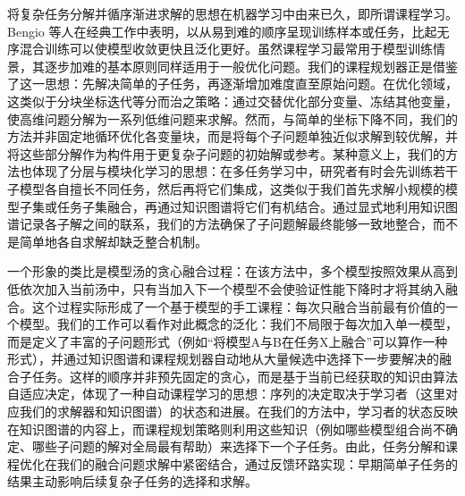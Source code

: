 \documentclass[../main.tex]{subfiles}
\begin{document}
\label{sec:ch5-2-2-task-decomposition-curriculum-optimization}
将复杂任务分解并循序渐进求解的思想在机器学习中由来已久，即所谓课程学习。Bengio 等人在经典工作中表明，以从易到难的顺序呈现训练样本或任务，比起无序混合训练可以使模型收敛更快且泛化更好。虽然课程学习最常用于模型训练情景，其逐步加难的基本原则同样适用于一般优化问题。我们的课程规划器正是借鉴了这一思想：先解决简单的子任务，再逐渐增加难度直至原始问题。在优化领域，这类似于分块坐标迭代等分而治之策略：通过交替优化部分变量、冻结其他变量，使高维问题分解为一系列低维问题来求解。然而，与简单的坐标下降不同，我们的方法并非固定地循环优化各变量块，而是将每个子问题单独近似求解到较优解，并将这些部分解作为构件用于更复杂子问题的初始解或参考。某种意义上，我们的方法也体现了分层与模块化学习的思想：在多任务学习中，研究者有时会先训练若干子模型各自擅长不同任务，然后再将它们集成，这类似于我们首先求解小规模的模型子集或任务子集融合，再通过知识图谱将它们有机结合。通过显式地利用知识图谱记录各子解之间的联系，我们的方法确保了子问题解最终能够一致地整合，而不是简单地各自求解却缺乏整合机制。

一个形象的类比是模型汤的贪心融合过程：在该方法中，多个模型按照效果从高到低依次加入当前汤中，只有当加入下一个模型不会使验证性能下降时才将其纳入融合。这个过程实际形成了一个基于模型的手工课程：每次只融合当前最有价值的一个模型。我们的工作可以看作对此概念的泛化：我们不局限于每次加入单一模型，而是定义了丰富的子问题形式（例如“将模型A与B在任务X上融合”可以算作一种形式），并通过知识图谱和课程规划器自动地从大量候选中选择下一步要解决的融合子任务。这样的顺序并非预先固定的贪心，而是基于当前已经获取的知识由算法自适应决定，体现了一种自动课程学习的思想：序列的决定取决于学习者（这里对应我们的求解器和知识图谱）的状态和进展。在我们的方法中，学习者的状态反映在知识图谱的内容上，而课程规划策略则利用这些知识（例如哪些模型组合尚不确定、哪些子问题的解对全局最有帮助）来选择下一个子任务。由此，任务分解和课程优化在我们的融合问题求解中紧密结合，通过反馈环路实现：早期简单子任务的结果主动影响后续复杂子任务的选择和求解。
\end{document}
